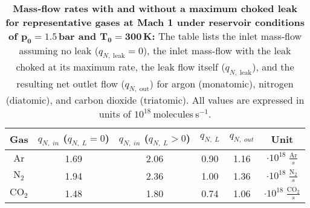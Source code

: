 \begin{table}[ht]
  \centering
  \renewcommand{\arraystretch}{1.4} %
  \begin{tabular}{|c||c||c|c|c||c|}
    \hline
    Gas & $q_{N,\;in}$ ($q_{N,\;L} = 0$) & $q_{N,\;in}$ ($q_{N,\;L} > 0$) & $q_{N,\;L}$ & $q_{N,\;out}$ & Unit\\ \hline \hline
    $\text{Ar}$ & 1.69 & 2.06 & 0.90 & 1.16 & $\cdot 10^{18} \; \frac{\text{Ar}}{s}$ \\ \hline
    $\text{N}_2$ & 1.94 & 2.36 & 1.00 & 1.36 & $\cdot 10^{18}\; \frac{\text{N}_2}{s}$ \\ \hline
    $\text{CO}_2$ & 1.48 & 1.80 & 0.74 & 1.06 & $\cdot 10^{18}\; \frac{\text{CO}_2}{s}$ \\ \hline
  \end{tabular}
   \caption[Mass‐flow rates with and without a choked leak for representative gases at Mach 1 under reservoir conditions of $p_0=1.5$\,bar and $T_0=300$\,K]{%
    \textbf{Mass‐flow rates with and without a maximum choked leak for representative gases at Mach 1 under reservoir conditions of $\mathbf{p_0=1.5}$\,bar and $\mathbf{T_0=300}$\,K:}  
    The table lists the inlet mass‐flow assuming no leak ($q_{N,\;\text{leak}}=0$), the inlet mass‐flow with the leak choked at its maximum rate, the leak flow itself ($q_{N,\;\text{leak}}$), and the resulting net outlet flow ($q_{N,\;\text{out}}$) for argon (monatomic), nitrogen (diatomic), and carbon dioxide (triatomic). All values are expressed in units of $10^{18}$ molecules s$^{-1}$.  
  }
  \label{tab:massflow_discussion}
\end{table}
